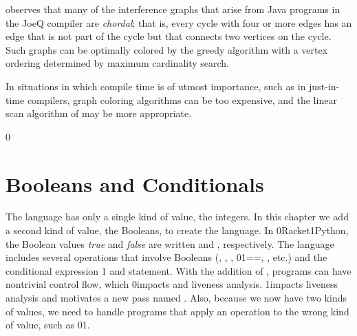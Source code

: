 \documentclass[7x10]{TimesAPriori_MIT}%
\def\racketEd{0}
\def\pythonEd{1}
\def\edition{1}
\newcommand{\racket}[1]{{\if\edition\racketEd{#1}\fi}}
\newcommand{\pythonColor}[0]{}
\newcommand{\python}[1]{{\if\edition\pythonEd\pythonColor #1\fi}}
\numberwithin{theorem}{chapter}
\numberwithin{definition}{chapter}
\numberwithin{equation}{chapter}
\begin{document}


\citet{Palsberg:2007si} observes that many of the interference graphs
that arise from Java programs in the JoeQ compiler are \emph{chordal};
that is, every cycle with four or more edges has an edge that is not
part of the cycle but that connects two vertices on the cycle. Such
graphs can be optimally colored by the greedy algorithm with a vertex
ordering determined by maximum cardinality search.

In situations in which compile time is of utmost importance, such as
in just-in-time compilers, graph coloring algorithms can be too
expensive, and the linear scan algorithm of \citet{Poletto:1999uq} may
be more appropriate.


{\if\edition\racketEd
{}
\fi}
\chapter{Booleans and Conditionals}
\label{ch:Lif}
\setcounter{footnote}{0}

The \LangVar{} language has only a single kind of value, the
integers. In this chapter we add a second kind of value, the Booleans,
to create the \LangIf{} language. In \racket{Racket}\python{Python},
the Boolean values \emph{true} and \emph{false}
are written
\TRUE{} and
\FALSE{}, respectively.  The \LangIf{}
language includes several operations that involve Booleans
(,
,
,
\racket{}\python{==},
\key{<}, etc.) and the
conditional expression
\python{ and statement}.
With the addition of , programs can have
nontrivial control flow, which
%
\racket{impacts  and liveness analysis.}
%
\python{impacts liveness analysis and motivates a new pass named
  \code{explicate\_control}.}
%
Also, because we now have two kinds of values, we need to handle
programs that apply an operation to the wrong kind of value, such as
\racket{}\python{}.
\end{document}
